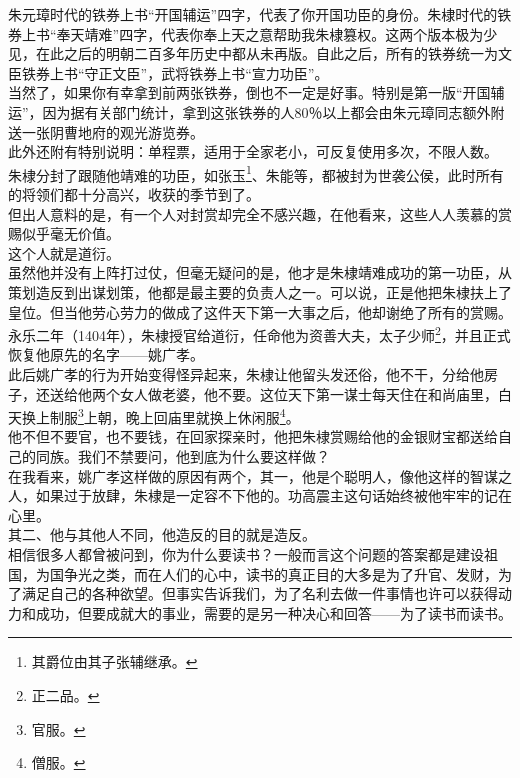 \begin{multicols}{\theparacolNo}
朱元璋时代的铁券上书“开国辅运”四字，代表了你开国功臣的身份。朱棣时代的铁券上书“奉天靖难”四字，代表你奉上天之意帮助我朱棣篡权。这两个版本极为少见，在此之后的明朝二百多年历史中都从未再版。自此之后，所有的铁券统一为文臣铁券上书“守正文臣”，武将铁券上书“宣力功臣”。\\

当然了，如果你有幸拿到前两张铁券，倒也不一定是好事。特别是第一版“开国辅运”，因为据有关部门统计，拿到这张铁券的人80％以上都会由朱元璋同志额外附送一张阴曹地府的观光游览券。\\

此外还附有特别说明：单程票，适用于全家老小，可反复使用多次，不限人数。\\

朱棣分封了跟随他靖难的功臣，如张玉\footnote{其爵位由其子张辅继承。}、朱能等，都被封为世袭公侯，此时所有的将领们都十分高兴，收获的季节到了。\\

但出人意料的是，有一个人对封赏却完全不感兴趣，在他看来，这些人人羡慕的赏赐似乎毫无价值。\\

这个人就是道衍。\\

虽然他并没有上阵打过仗，但毫无疑问的是，他才是朱棣靖难成功的第一功臣，从策划造反到出谋划策，他都是最主要的负责人之一。可以说，正是他把朱棣扶上了皇位。但当他劳心劳力的做成了这件天下第一大事之后，他却谢绝了所有的赏赐。永乐二年（1404年），朱棣授官给道衍，任命他为资善大夫，太子少师\footnote{正二品。}，并且正式恢复他原先的名字——姚广孝。\\

此后姚广孝的行为开始变得怪异起来，朱棣让他留头发还俗，他不干，分给他房子，还送给他两个女人做老婆，他不要。这位天下第一谋士每天住在和尚庙里，白天换上制服\footnote{官服。}上朝，晚上回庙里就换上休闲服\footnote{僧服。}。\\

他不但不要官，也不要钱，在回家探亲时，他把朱棣赏赐给他的金银财宝都送给自己的同族。我们不禁要问，他到底为什么要这样做？\\

在我看来，姚广孝这样做的原因有两个，其一，他是个聪明人，像他这样的智谋之人，如果过于放肆，朱棣是一定容不下他的。功高震主这句话始终被他牢牢的记在心里。\\

其二、他与其他人不同，他造反的目的就是造反。\\

相信很多人都曾被问到，你为什么要读书？一般而言这个问题的答案都是建设祖国，为国争光之类，而在人们的心中，读书的真正目的大多是为了升官、发财，为了满足自己的各种欲望。但事实告诉我们，为了名利去做一件事情也许可以获得动力和成功，但要成就大的事业，需要的是另一种决心和回答——为了读书而读书。\\


\end{multicols}
